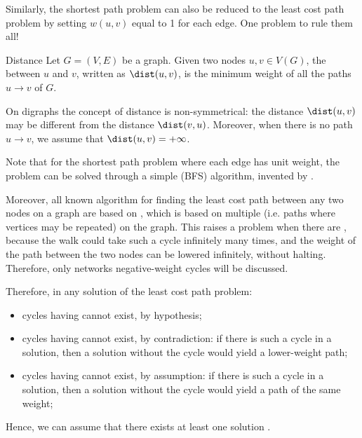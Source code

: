 \documentclass[a4paper, 12pt]{report}
\begin{document}
    Similarly, the shortest path problem can also be reduced to the least cost path problem by setting $w(u,v)$ equal to 1 for each edge. One problem to rule them all!

    \begin{frameddefn}{Distance}
        Let $G = (V,E)$ be a graph. Given two nodes $u,v \in V(G)$, the  between $u$ and $v$, written as $\dist(u,v)$, is the minimum weight of all the paths $u \to v$ of $G$.
    \end{frameddefn}

    On digraphs the concept of distance is non-symmetrical: the distance $\dist(u,v)$ may be different from the distance $\dist(v,u)$. Moreover, when there is no path $u \to v$, we assume that $\dist(u,v) = +\infty$.

    Note that for the  shortest path problem where each edge has unit weight, the problem can be solved through a simple  (BFS) algorithm, invented by \textcite{moore}.

    Moreover, all known algorithm for finding the least cost path between any two nodes on a graph are based on , which is based on multiple  (i.e. paths where vertices may be repeated) on the graph. This raises a problem when there are , because the walk could take such a cycle infinitely many times, and the weight of the path between the two nodes can be lowered infinitely, without halting. Therefore, only networks  negative-weight cycles will be discussed.

    Therefore, in any solution of the least cost path problem:

    \begin{itemize}
        \item cycles having  cannot exist, by hypothesis;
        \item cycles having  cannot exist, by contradiction: if there is such a cycle in a solution, then a solution without the cycle would yield a lower-weight path;
        \item cycles having  cannot exist, by assumption: if there is such a cycle in a solution, then a solution without the cycle would yield a path of the same weight;
    \end{itemize}

    Hence, we can assume that there exists at least one solution .
    
\end{document}
